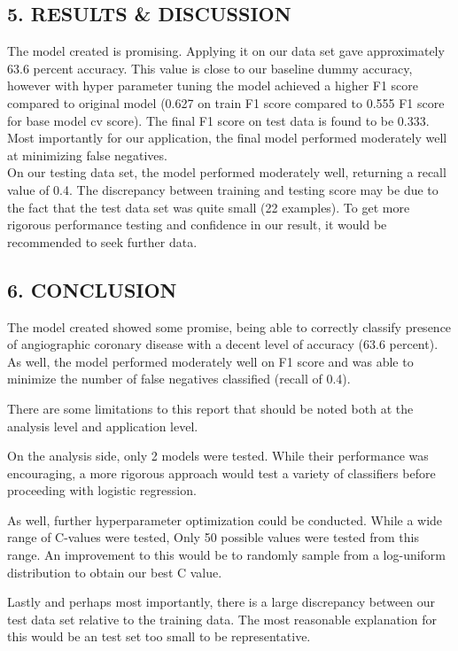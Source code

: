 \documentclass[
  letterpaper,
  DIV=11,
  numbers=noendperiod]{scrartcl}
\begin{document}
\subsection{5. RESULTS \& DISCUSSION}\label{results-discussion}

The model created is promising. Applying it on our data set gave
approximately 63.6 percent accuracy. This value is close to our baseline
dummy accuracy, however with hyper parameter tuning the model achieved a
higher F1 score compared to original model (0.627 on train F1 score
compared to 0.555 F1 score for base model cv score). The final F1 score
on test data is found to be 0.333. Most importantly for our application,
the final model performed moderately well at minimizing false
negatives.\\
On our testing data set, the model performed moderately well, returning
a recall value of 0.4. The discrepancy between training and testing
score may be due to the fact that the test data set was quite small (22
examples). To get more rigorous performance testing and confidence in
our result, it would be recommended to seek further data.

\subsection{6. CONCLUSION}\label{conclusion}

The model created showed some promise, being able to correctly classify
presence of angiographic coronary disease with a decent level of
accuracy (63.6 percent). As well, the model performed moderately well on
F1 score and was able to minimize the number of false negatives
classified (recall of 0.4).

There are some limitations to this report that should be noted both at
the analysis level and application level.

On the analysis side, only 2 models were tested. While their performance
was encouraging, a more rigorous approach would test a variety of
classifiers before proceeding with logistic regression.

As well, further hyperparameter optimization could be conducted. While a
wide range of C-values were tested, Only 50 possible values were tested
from this range. An improvement to this would be to randomly sample from
a log-uniform distribution to obtain our best C value.

Lastly and perhaps most importantly, there is a large discrepancy
between our test data set relative to the training data. The most
reasonable explanation for this would be an test set too small to be
representative.
\end{document}
